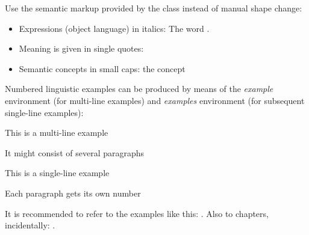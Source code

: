 \documentclass[naustrian,english]{univie-ling-thesis}
\begin{document}
Use the semantic markup provided by the class instead of manual shape change:
\begin{itemize}
	\item Expressions (object language) in italics: The word .
	\item Meaning is given in single quotes: 
	\item Semantic concepts in small caps: the concept 
\end{itemize}
%
Numbered linguistic examples can be produced by means of the \emph{example} environment (for multi-line examples) and \emph{examples} environment
(for subsequent single-line examples):

\begin{example}
	This is a multi-line example
	
	It might consist of several paragraphs
\end{example}

\begin{examples}
	\item This is a single-line example\label{exa:example-single}
	\item Each paragraph gets its own number
\end{examples}
%
It is recommended to refer to the examples like this: . Also to chapters, incidentally: .

\printbibliography[heading=bibnumbered]
\end{document}
